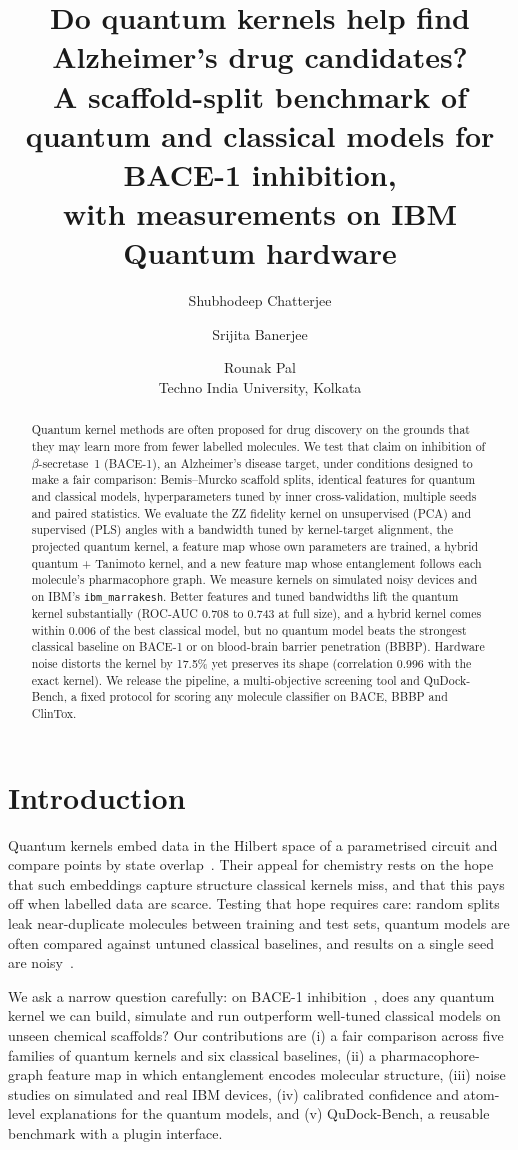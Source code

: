 \documentclass[11pt]{article}
\title{Do quantum kernels help find Alzheimer's drug candidates?\\
\large A scaffold-split benchmark of quantum and classical models for BACE-1 inhibition,\\
with measurements on IBM Quantum hardware}
\author{Shubhodeep Chatterjee \and Srijita Banerjee \and Rounak Pal\\
\small Techno India University, Kolkata}
\date{}
\begin{document}
\maketitle

\begin{abstract}
Quantum kernel methods are often proposed for drug discovery on the grounds that they may learn
more from fewer labelled molecules. We test that claim on inhibition of $\beta$-secretase~1
(BACE-1), an Alzheimer's disease target, under conditions designed to make a fair comparison:
Bemis--Murcko scaffold splits, identical features for quantum and classical models,
hyperparameters tuned by inner cross-validation, multiple seeds and paired statistics. We
evaluate the ZZ fidelity kernel on unsupervised (PCA) and supervised (PLS) angles with a
bandwidth tuned by kernel-target alignment, the projected quantum kernel, a feature map whose
own parameters are trained, a hybrid quantum + Tanimoto kernel, and a new feature map whose
entanglement follows each molecule's pharmacophore graph. We measure kernels on simulated noisy
devices and on IBM's \texttt{ibm\_marrakesh}. Better features and tuned bandwidths lift the
quantum kernel substantially (ROC-AUC 0.708 to 0.743 at full size), and a hybrid kernel comes
within 0.006 of the best classical model, but no quantum model beats the strongest classical
baseline on BACE-1 or on blood-brain barrier penetration (BBBP). Hardware noise distorts the
kernel by 17.5\% yet preserves its shape (correlation 0.996 with the exact kernel). We release
the pipeline, a multi-objective screening tool and QuDock-Bench, a fixed protocol for scoring
any molecule classifier on BACE, BBBP and ClinTox.
\end{abstract}

\section{Introduction}
Quantum kernels embed data in the Hilbert space of a parametrised circuit and compare points by
state overlap~\cite{havlicek2019}. Their appeal for chemistry rests on the hope that such
embeddings capture structure classical kernels miss, and that this pays off when labelled data
are scarce. Testing that hope requires care: random splits leak near-duplicate molecules
between training and test sets, quantum models are often compared against untuned classical
baselines, and results on a single seed are noisy~\cite{bowles2024}.

We ask a narrow question carefully: on BACE-1 inhibition~\cite{wu2018}, does any quantum kernel
we can build, simulate and run outperform well-tuned classical models on unseen chemical
scaffolds? Our contributions are
(i) a fair comparison across five families of quantum kernels and six classical baselines,
(ii) a pharmacophore-graph feature map in which entanglement encodes molecular structure,
(iii) noise studies on simulated and real IBM devices,
(iv) calibrated confidence and atom-level explanations for the quantum models, and
(v) QuDock-Bench, a reusable benchmark with a plugin interface.
\end{document}
